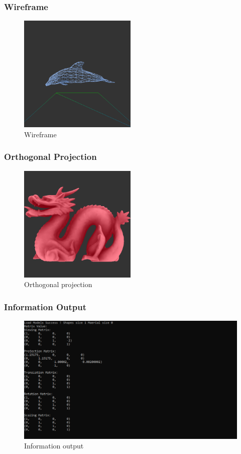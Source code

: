 \documentclass{beamer}
\begin{document}
\begin{frame}
  \frametitle{Wireframe}
  \begin{figure}
    \includegraphics[width=0.5\textwidth]{wireframe}
    \caption{Wireframe}
  \end{figure}
\end{frame}

\begin{frame}
  \frametitle{Orthogonal Projection}
  \begin{figure}
    \includegraphics[width=0.5\textwidth]{orthogonal_projection}
    \caption{Orthogonal projection}
  \end{figure}
\end{frame}

\begin{frame}
  \frametitle{Information Output}
  \begin{figure}
    \includegraphics[width=\textwidth]{information_output}
    \caption{Information output}
  \end{figure}
\end{frame}
\end{document}
